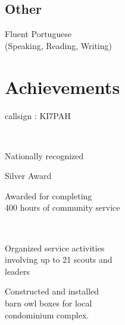 \documentclass[]{deedy-resume-openfont}
\begin{document}
\begin{minipage}[t]{0.33\textwidth}
\subsection{Other}
\textbullet{} Fluent Portuguese \\ (Speaking, Reading, Writing) \\
\sectionsep


\section{Achievements}

\bigbreak
\begin{tightemize}
\item \normalsize{callsign : KI7PAH}
\end{tightemize}

\sectionsep
{}
\\
\begin{tightemize}
\item \normalsize{Nationally recognized}
\item \normalsize{Silver Award}
\item \normalsize{Awarded for completing\\ 400 hours of community service}
\end{tightemize}

\sectionsep

\\
\begin{tightemize}
\item \normalsize{Organized service activities\\ involving up to 21 scouts and\\ leaders}
\item \normalsize{Constructed and installed\\ barn owl boxes for local\\ condominium complex.}
\end{tightemize}

\sectionsep


%
%

\end{minipage} 
\hfill
\end{document}
